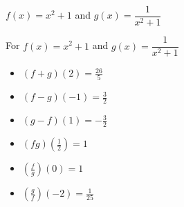 {$f(x) = x^2+1$ and $g(x) = \dfrac{1}{x^2+1}$}
{For  $f(x) = x^2+1$ and $g(x) = \dfrac{1}{x^2+1}$

\begin{multicols}{2}
\begin{itemize}
\item  $(f+g)(2) =\frac{26}{5}$
\item  $(f-g)(-1) = \frac{3}{2}$
\item  $(g-f)(1) = -\frac{3}{2}$
\item  $(fg)\left(\frac{1}{2}\right) =1$
\item  $\left(\frac{f}{g}\right)(0) = 1$
\item  $\left(\frac{g}{f}\right)\left(-2\right) = \frac{1}{25}$
\end{itemize}
\end{multicols}
}